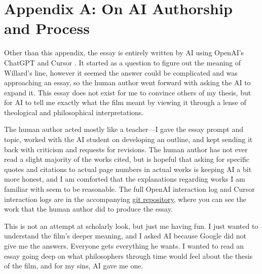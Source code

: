 \section*{Appendix A: On AI Authorship and Process}
\label{app:ai-authorship}

Other than this appendix, the essay is entirely written by AI using OpenAI's ChatGPT
\parencite{OpenAIChatGPT2024} and Cursor \parencite{CursorAI2024}. It started as a question
to figure out the meaning of Willard's line, however it seemed the answer could be complicated
and was approaching an essay, so the human author went forward with asking the AI to expand
it. This essay does not exist for me to convince others of my thesis, but for AI to tell me
exactly what the film meant by viewing it through a lense of theological and philosophical
interpretations.

The human author acted mostly like a teacher---I gave the essay prompt and topic, worked
with the AI student on developing an outline, and kept sending it back with criticism and
requests for revisions. The human author has not ever read a slight majority of the works
cited, but is hopeful that asking for specific quotes and citations to actual page numbers in
actual works is keeping AI a bit more honest, and I am comforted that the explanations
regarding works I am familiar with seem to be reasonable. The full OpenAI interaction log and
Cursor interaction logs are in the accompanying
\href{https://github.com/jmalicki/apocalypse-now-essay/tree/main/interaction-logs}{git
	repository}, where you can see the work that the human author did to produce the essay.

This is not an attempt at scholarly look, but just me having fun.
I just wanted to understand the film's deeper
meaning, and I asked AI because Google did not give me the answers.  Everyone gets everything
he wants.  I wanted to read an essay going deep on what philosophers through time would feel
about the thesis of the film, and for my sins, AI gave me one.
